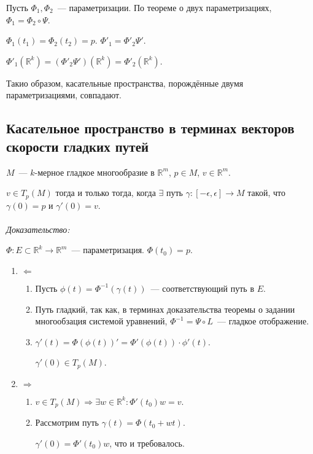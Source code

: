 \documentclass[paper=a4, fontsize=11pt]{article}
\begin{document}
Пусть $\Phi_1,\Phi_2$~--- параметризации. По теореме о двух параметризациях, $\Phi_1 = \Phi_2 \circ \Psi$.

$\Phi_1(t_1) = \Phi_2(t_2) = p$. $\Phi'_1 = \Phi'_2 \Psi'$.

$\Phi'_1(\mathds{R}^k) = (\Phi'_2 \Psi')(\mathds{R}^k) = \Phi'_2(\mathds{R}^k)$.

Такио образом, касательные пространства, порождённые двумя параметризациями, совпадают.

\subsection{Касательное пространство в терминах векторов скорости гладких путей}
$M$~--- $k$-мерное гладкое многообразие в $\mathds{R}^m$, $p \in M$, $v \in \mathds{R}^m$.

$v \in T_p(M)$ тогда и только тогда, когда $\exists$ путь $\gamma:[-\epsilon,\epsilon] \rightarrow M$ такой, что
$\gamma(0) = p$ и $\gamma'(0) = v$.
\\\\
\emph{Доказательство:}

$\Phi: E \subset \mathds{R}^k \to \mathds{R}^m$~--- параметризация. $\Phi(t_0) = p$.
\begin{enumerate}
    \item $\Leftarrow$
    \begin{enumerate}
        \item Пусть $\phi(t) = \Phi^{-1}(\gamma(t))$~--- соответствующий путь в $E$.
        \item Путь гладкий, так как, в терминах доказательства теоремы о задании многообзация системой уравнений,
        $\Phi^{-1} = \Psi \circ L$~--- гладкое отображение.
        \item $\gamma'(t) = \Phi(\phi(t))' = \Phi'(\phi(t))\cdot \phi'(t)$.

        $\gamma'(0) \in T_p(M)$.
    \end{enumerate}
    \item $\Rightarrow$
    \begin{enumerate}
        \item $v \in T_p(M) \Rightarrow \exists w \in \mathds{R}^k: \Phi'(t_0) w = v$.
        \item Рассмотрим путь $\gamma(t) = \Phi(t_0 + wt)$.

        $\gamma'(0) = \Phi'(t_0) w$, что и требовалось.
    \end{enumerate}
\end{enumerate}
\end{document}
